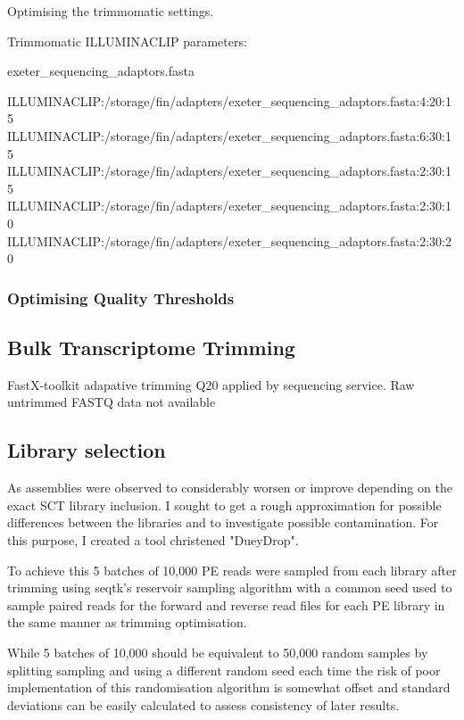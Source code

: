 Optimising the trimmomatic settings.



Trimmomatic ILLUMINACLIP parameters: 

exeter_sequencing_adaptors.fasta

ILLUMINACLIP:/storage/fin/adapters/exeter_sequencing_adaptors.fasta:4:20:15
ILLUMINACLIP:/storage/fin/adapters/exeter_sequencing_adaptors.fasta:6:30:15
ILLUMINACLIP:/storage/fin/adapters/exeter_sequencing_adaptors.fasta:2:30:15
ILLUMINACLIP:/storage/fin/adapters/exeter_sequencing_adaptors.fasta:2:30:10
ILLUMINACLIP:/storage/fin/adapters/exeter_sequencing_adaptors.fasta:2:30:20

\subsubsection{Optimising Quality Thresholds}


\subsection{Bulk Transcriptome Trimming}

FastX-toolkit adapative trimming Q20 applied by sequencing service.
Raw untrimmed FASTQ data not available



\subsection{Library selection}
As assemblies were observed to considerably worsen or improve depending on the exact 
SCT library inclusion.  I sought to get a rough approximation for possible differences between
the libraries and to investigate possible contamination.  For this purpose, I created a tool
christened "DueyDrop".

To achieve this 5 batches of 10,000 PE reads were sampled from each library after trimming %
using seqtk's \citep{SeqtkGitHub} reservoir sampling algorithm with a common seed used to sample paired
reads for the forward and reverse read files for each PE library in the same manner as trimming optimisation.

While 5 batches of 10,000 should be equivalent to 50,000 random samples by splitting sampling and using
a different random seed each time the risk of poor implementation of this randomisation algorithm is 
somewhat offset and standard deviations can be easily calculated to assess consistency of later results.

